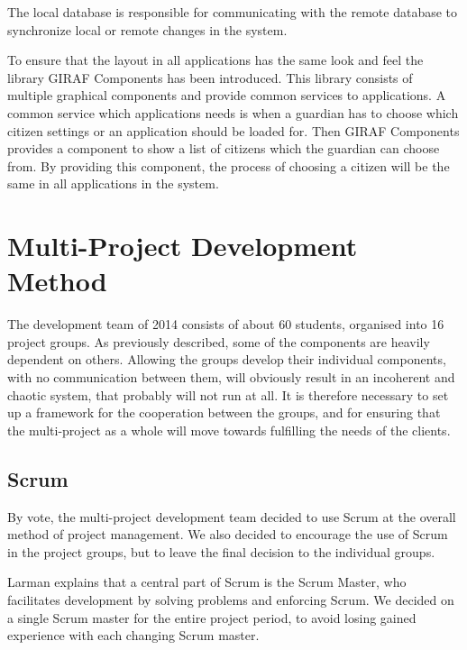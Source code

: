 The local database is responsible for communicating with the remote database to synchronize local or remote changes in the system.

To ensure that the layout in all applications has the same look and feel the library GIRAF Components has been introduced.
This library consists of multiple graphical components and provide common services to applications.
A common service which applications needs is when a guardian has to choose which citizen settings or an application should be loaded for. Then GIRAF Components provides a component to show a list of citizens which the guardian can choose from. By providing this component, the process of choosing a citizen will be the same in all applications in the \giraf system.


\section{Multi-Project Development Method}\label{sec:giraf:development}
The \giraf development team of 2014 consists of about 60 students, organised into 16 project groups. 
As previously described, some of the \giraf components are heavily dependent on others. 
Allowing the groups develop their individual components, with no communication between them, will obviously result in an incoherent and chaotic system, that probably will not run at all. 
It is therefore necessary to set up a framework for the cooperation between the groups, and for ensuring that the multi-project as a whole will move towards fulfilling the needs of the clients.

\subsection{Scrum}
By vote, the multi-project development team decided to use Scrum at the overall method of project management. 
We also decided to encourage the use of Scrum in the project groups, but to leave the final decision to the individual groups. 

Larman \cite{larmanAgile} explains that a central part of Scrum is the Scrum Master, who facilitates development by solving problems and enforcing Scrum. We decided on a single Scrum master for the entire project period, to avoid losing gained experience with each changing Scrum master.


